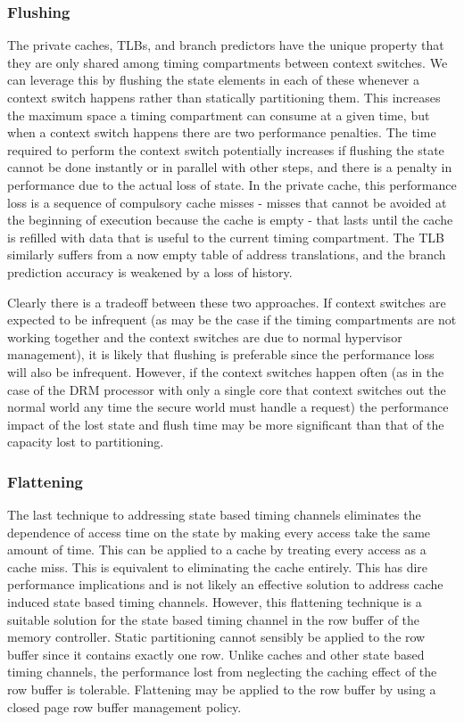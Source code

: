 \subsubsection{Flushing}
The private caches, TLBs, and branch predictors have the unique property that 
they are only shared among timing compartments between context switches. We can 
leverage this by flushing the state elements in each of these whenever  a 
context switch happens rather than statically partitioning them. This increases 
the maximum space a timing compartment can consume at a given time, but when a 
context switch happens there are two performance penalties. The time required 
to perform the context switch potentially increases if flushing the state 
cannot be done instantly or in parallel with other steps, and there is a 
penalty in performance due to the actual loss of state. In the private cache, 
this performance loss is a sequence of compulsory cache misses - misses that 
cannot be avoided at the beginning of execution because the cache is empty - 
that lasts until the cache is refilled with data that is useful to the current 
timing compartment. The TLB similarly suffers from a now empty table of address 
translations, and the branch prediction accuracy is weakened by a loss of 
history. 

Clearly there is a tradeoff between these two approaches. If context switches 
are expected to be infrequent (as may be the case if the timing compartments 
are not working together and the context switches are due to normal hypervisor 
management), it is likely that flushing is preferable since the performance 
loss will also be infrequent. However, if the context switches happen often (as 
in the case of the DRM processor with only a single core that context switches 
out the normal world any time the secure world must handle a request) the 
performance impact of the lost state and flush time may be more significant 
than that of the capacity lost to partitioning.

\subsubsection{Flattening}
The last technique to addressing state based timing channels eliminates the 
dependence of access time on the state by making every access take the same 
amount of time. This can be applied to a cache by treating every access as a 
cache miss. This is equivalent to eliminating the cache entirely. This has dire 
performance implications and is not likely an effective solution to address 
cache induced state based timing channels. However, this flattening technique 
is a suitable solution for the state based timing channel in the row buffer of 
the memory controller. Static partitioning cannot sensibly be applied to the 
row buffer since it contains exactly one row. Unlike caches and other state 
based timing channels, the performance lost from neglecting the caching effect 
of the row buffer is tolerable. Flattening may be applied to the row buffer by 
using a closed page row buffer management policy.

